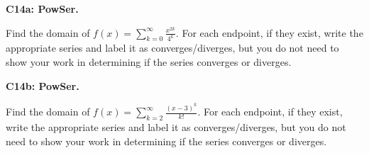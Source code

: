 \documentclass[12pt]{article}
\newcommand{\<}{\left\langle}
\renewcommand{\>}{\right\rangle}
\newcommand{\exerciseHeader}[4]{


  \vspace{0.5em}
  \textbf{#2}
  \vspace{0.5em}

}
\begin{document}
\begin{multicols}{2}
%

%

\columnbreak

%

\exerciseHeader{2017 July 24}{C14a: PowSer.}{
Identify the domain of a function defined as a power series.
}{}

Find the domain of \(f(x)=\sum_{k=0}^\infty \frac{x^{2k}}{4^k}\).
For each endpoint, if they exist, write the appropriate series and label it
as converges/diverges, but you
do not need to show your work in determining if the series converges or
diverges.

\exerciseHeader{2017 July 24}{C14b: PowSer.}{
Identify the domain of a function defined as a power series.
}{}

Find the domain of \(f(x)=\sum_{k=2}^\infty \frac{(x-3)^k}{k!}\).
For each endpoint, if they exist, write the appropriate series and label it
as converges/diverges, but you
do not need to show your work in determining if the series converges or
diverges.



%

%


\end{multicols}
\end{document}

